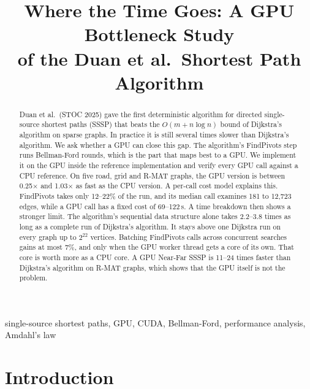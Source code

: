 \documentclass[conference]{IEEEtran}
\begin{document}
\title{Where the Time Goes: A GPU Bottleneck Study\\ of the Duan et al.\ Shortest Path Algorithm}

\author{
}

\maketitle

\begin{abstract}
Duan et al.\ (STOC 2025) gave the first deterministic algorithm for directed single-source shortest paths (SSSP) that
beats the $O(m + n\log n)$ bound of Dijkstra's algorithm on sparse graphs. In practice it is still several times slower
than Dijkstra's algorithm. We ask whether a GPU can close this gap. The algorithm's FindPivots step runs Bellman-Ford
rounds, which is the part that maps best to a GPU. We implement it on the GPU inside the reference implementation and
verify every GPU call against a CPU reference. On five road, grid and R-MAT graphs, the GPU version is between
0.25$\times$ and 1.03$\times$ as fast as the CPU version. A per-call cost model explains this. FindPivots takes only
12--22\% of the run, and its median call examines 181 to 12{,}723 edges, while a GPU call has a fixed cost of
69--122\,\textmu s. A time breakdown then shows a stronger limit. The algorithm's sequential data structure alone takes
2.2--3.8 times as long as a complete run of Dijkstra's algorithm. It stays above one Dijkstra run on every graph up to
$2^{22}$ vertices. Batching FindPivots calls across concurrent searches gains at most 7\%, and only when the GPU worker thread
gets a core of its own. That core is worth more as a CPU core. A GPU Near-Far SSSP is 11--24 times faster than
Dijkstra's algorithm on R-MAT graphs, which shows that the GPU itself is not the problem.
\end{abstract}

\begin{IEEEkeywords}
single-source shortest paths, GPU, CUDA, Bellman-Ford, performance analysis, Amdahl's law
\end{IEEEkeywords}

\section{Introduction}
\end{document}
